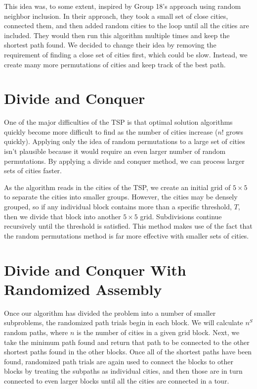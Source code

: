 \documentclass[12pt,letterpaper]{article}
\begin{document}
This idea was, to some extent, inspired by Group 18's approach using random neighbor inclusion. In their approach, they took a small set of close cities, connected them, and then added random cities to the loop until all the cities are included. They would then run this algorithm multiple times and keep the shortest path found. We decided to change their idea by removing the requirement of finding a close set of cities first, which could be slow. Instead, we create many more permutations of cities and keep track of the best path.

\section*{Divide and Conquer}

One of the major difficulties of the TSP is that optimal solution algorithms quickly become more difficult to find as the number of cities increase ($n!$ grows quickly). Applying only the idea of random permutations to a large set of cities isn't plausible because it would require an even larger number of random permutations. By applying a divide and conquer method, we can process larger sets of cities faster.

As the algorithm reads in the cities of the TSP, we create an initial grid of $5 \times 5$ to separate the cities into smaller groups. However, the cities may be densely grouped, so if any individual block contains more than a specific threshold, $T$, then we divide that block into another $5 \times 5$ grid. Subdivisions continue recursively until the threshold is satisfied. This method makes use of the fact that the random permutations method is far more effective with smaller sets of cities.

\section*{Divide and Conquer With Randomized Assembly}

Once our algorithm has divided the problem into a number of smaller subproblems, the randomized path trials begin in each block. We will calculate $n^S$ random paths, where $n$ is the number of cities in a given grid block. Next, we take the minimum path found and return that path to be connected to the other shortest paths found in the other blocks. Once all of the shortest paths have been found, randomized path trials are again used to connect the blocks to other blocks by treating the subpaths as individual cities, and then those are in turn connected to even larger blocks until all the cities are connected in a tour.
\end{document}
